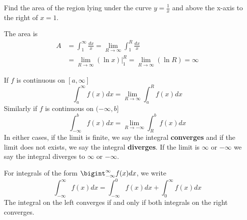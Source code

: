 \documentclass[../calc1-main.tex]{subfiles}
\begin{document}
\begin{example}
	Find the area of the region lying under the curve $y=\frac{1}{x}$ and above the x-axis to the right of $x=1$.
\end{example}
\begin{minipage}{0.5\textwidth}
  \begin{solution}
  	The area is
  	\[
  	\begin{split}
  		A & = \int_1^{\infty} \frac{dx}{x} =
  		\lim_{R \to \infty} \int_1^R \frac{dx}{x} \\
  		& = \lim_{R \to \infty} \left.\left( \ln x \right)\right \vert_1^R= 
  		\lim_{R \to \infty} \left( \ln R \right) = 
  		\infty
  	\end{split}
  	\]
  \end{solution}
\end{minipage}%
\begin{minipage}{0.5\textwidth}
\begin{figure}[H]
  	\centering
\end{figure}
\end{minipage}

\begin{definition}
	If $f$ is continuous on $[a, \infty]$
	\[
		\int_a^{\infty} f(x) dx = \lim_{R \to \infty} \int_a^R f(x) dx
	\]
	Similarly if $f$ is continuous on $(-\infty, b]$
	\[
		\int_{-\infty}^b f(x) dx = \lim_{R \to -\infty} \int_R^b f(x) dx
	\]
	In either cases, if the limit is finite, we say the integral \textbf{converges} and if the limit does not exists, we say the integral \textbf{diverges}. If the limit is $\infty$ or $-\infty$ we say the integral diverges to $\infty$ or $-\infty$.
\end{definition}

For integrals of the form $\bigint_{-\infty}^{\infty} f(x) dx$, we write
\[
	\int_{-\infty}^{\infty} f(x) dx = \int_{-\infty}^0 f(x) dx + \int_0^{\infty} f(x) dx
\]
The integral on the left converges if and only if both integrals on the right converges.
\end{document}
